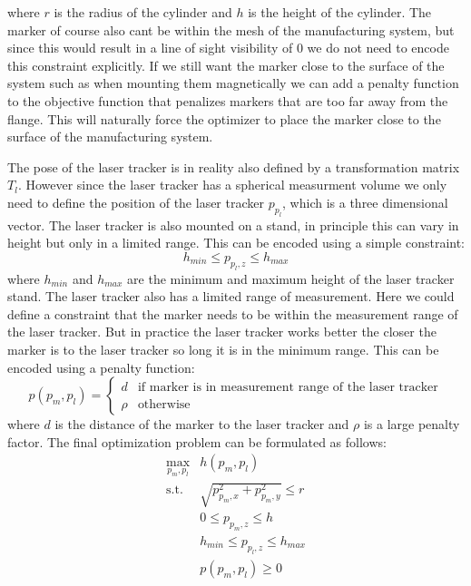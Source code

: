 \documentclass{svproc}
\begin{document}
where $r$ is the radius of the cylinder and $h$ is the height of the cylinder.
The marker of course also cant be within the mesh of the manufacturing system, but since this would result in a line of sight visibility of 0 we do not need to encode this constraint explicitly.
If we still want the marker close to the surface of the system such as when mounting them magnetically we can add a penalty function to the objective function that penalizes markers that are too far away from the flange.
This will naturally force the optimizer to place the marker close to the surface of the manufacturing system.

The pose of the laser tracker is in reality also defined by a transformation matrix $T_{l}$.
However since the laser tracker has a spherical measurment volume we only need to define the position of the laser tracker $p_{p_l}$, which is a three dimensional vector.
The laser tracker is also mounted on a stand, in principle this can vary in height but only in a limited range.
This can be encoded using a simple constraint:
\begin{equation}
    h_{min} \leq p_{p_l,z} \leq h_{max}
\end{equation}
where $h_{min}$ and $h_{max}$ are the minimum and maximum height of the laser tracker stand.
The laser tracker also has a limited range of measurement.
Here we could define a constraint that the marker needs to be within the measurement range of the laser tracker.
But in practice the laser tracker works better the closer the marker is to the laser tracker so long it is in the minimum range.
This can be encoded using a penalty function:
\begin{equation}
    p(p_m,p_l) =  \begin{cases}
        d & \text{if } \text{marker is in measurement range of the laser tracker} \\
        \rho & \text{otherwise}
    \end{cases}
\end{equation}
where $d$ is the distance of the marker to the laser tracker and $\rho$ is a large penalty factor.
The final optimization problem can be formulated as follows:
\begin{equation}
    \begin{split}
    \max_{p_m,p_l} & h(p_m,p_l) \\
    \text{s.t.} & \sqrt{p_{p_m,x}^2 + p_{p_m,y}^2} \leq r \\
    & 0 \leq p_{p_m,z} \leq h \\
    & h_{min} \leq p_{p_l,z} \leq h_{max} \\
    & p(p_m,p_l) \geq 0
    \end{split}
\end{equation}
\end{document}
